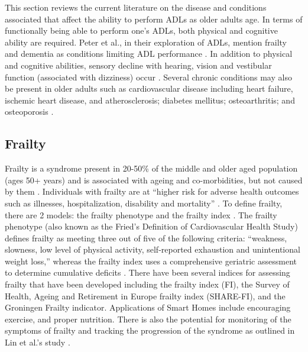 This section reviews the current literature on the disease and conditions associated that affect the ability to perform ADLs as older adults age. In terms of functionally being able to perform one's ADLs, both physical and cognitive ability are required. Peter et al., in their exploration of ADLs, mention frailty and dementia as conditions limiting ADL performance \cite{edemekong_activities_2022}. In addition to physical and cognitive abilities, sensory decline with hearing, vision and vestibular function (associated with dizziness) occur \cite{jaul_age-related_2017}. Several chronic conditions may also be present in older adults such as cardiovascular disease including heart failure, ischemic heart disease, and atherosclerosis; diabetes mellitus; osteoarthritis; and osteoporosis \cite{jaul_age-related_2017}.

\subsection{Frailty}
Frailty is a syndrome present in 20-50\% of the middle and older aged population (ages 50+ years) \cite{hewitt_prevalence_2018} and is associated with ageing and co-morbidities, but not caused by them \cite{conroy_defining_2009}. Individuals with frailty are at “higher risk for adverse health outcomes such as illnesses, hospitalization, disability and mortality” . To define frailty, there are 2 models: the frailty phenotype and the frailty index \cite{chen_frailty_2014}. The frailty phenotype (also known as the Fried’s Definition of Cardiovascular Health Study) defines frailty as meeting three out of five of the following criteria: “weakness, slowness, low level of physical activity, self-reported exhaustion and unintentional weight loss,” whereas the frailty index uses a comprehensive geriatric assessment to determine cumulative deficits \cite{chen_frailty_2014}. There have been several indices for assessing frailty that have been developed including the frailty index (FI), the Survey of Health, Ageing and Retirement in Europe frailty index (SHARE-FI), and the Groningen Frailty indicator. Applications of Smart Homes include encouraging exercise, and proper nutrition. There is also the potential for monitoring of the symptoms of frailty and tracking the progression of the syndrome as outlined in Lin et al.’s study \cite{lin_development_2016}.

